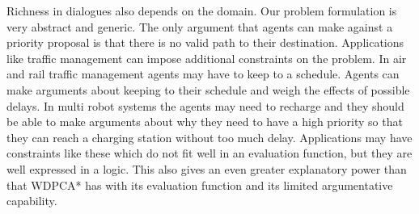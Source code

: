 Richness in dialogues also depends on the domain. Our problem formulation is
very abstract and generic. The only argument that agents can make against a
priority proposal is that there is no valid path to their destination.
Applications like traffic management can impose additional constraints on the
problem. In air and rail traffic management agents may have to keep to a 
schedule.
Agents can make arguments about keeping to their schedule and weigh the effects 
of possible delays. In multi robot systems the
agents may need to recharge and they should be able to make arguments about why
they need to have a high priority so that they can reach a charging station
without too much delay. Applications may have constraints like these which do
not fit well in an evaluation function, but they are well expressed in a logic.
This also gives an even greater explanatory power than that WDPCA* has with its
evaluation function and its limited argumentative capability.

%    
%

